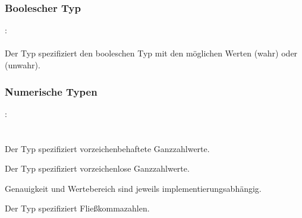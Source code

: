 \subsubsection{Boolescher Typ}\label{Boolescher Typ}
:\label{typ_bool}\\
\hspace*{1cm}\\

Der Typ  spezifiziert den booleschen Typ mit den möglichen Werten
 (wahr) oder  (unwahr).


\subsubsection{Numerische Typen}\label{Numerische Typen}
:\label{typ_num}\\
\hspace*{1cm}\Gspace{}\\
\hspace*{1cm}\\

Der Typ  spezifiziert vorzeichenbehaftete Ganzzahlwerte.

Der Typ  spezifiziert vorzeichenlose Ganzzahlwerte.

Genauigkeit und Wertebereich sind jeweils implementierungsabhängig.

Der Typ  spezifiziert Fließkommazahlen.







